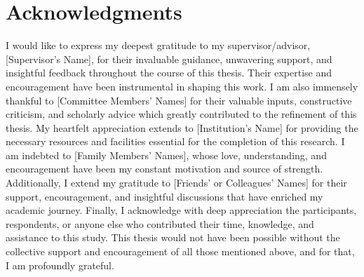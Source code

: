 
\chapter{Acknowledgments}

I would like to express my deepest gratitude to my supervisor/advisor, [Supervisor's Name], for their invaluable guidance, unwavering support, and insightful feedback throughout the course of this thesis. Their expertise and encouragement have been instrumental in shaping this work.
I am also immensely thankful to [Committee Members' Names] for their valuable inputs, constructive criticism, and scholarly advice which greatly contributed to the refinement of this thesis.
My heartfelt appreciation extends to [Institution's Name] for providing the necessary resources and facilities essential for the completion of this research.
I am indebted to [Family Members' Names], whose love, understanding, and encouragement have been my constant motivation and source of strength.
Additionally, I extend my gratitude to [Friends' or Colleagues' Names] for their support, encouragement, and insightful discussions that have enriched my academic journey.
Finally, I acknowledge with deep appreciation the participants, respondents, or anyone else who contributed their time, knowledge, and assistance to this study.
This thesis would not have been possible without the collective support and encouragement of all those mentioned above, and for that, I am profoundly grateful.

\cleardoublepage
